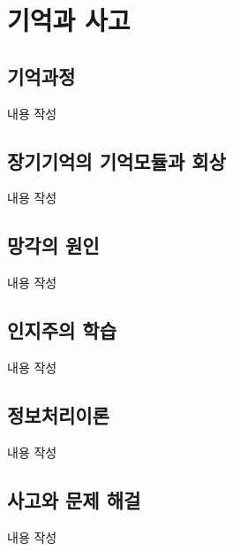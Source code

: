 \section{기억과 사고}

\subsection{기억과정}
내용 작성

\subsection{장기기억의 기억모듈과 회상}
내용 작성

\subsection{망각의 원인}
내용 작성

\subsection{인지주의 학습}
내용 작성

\subsection{정보처리이론}
내용 작성

\subsection{사고와 문제 해걸}
내용 작성
